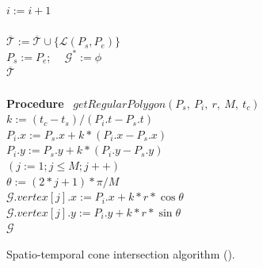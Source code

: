 \begin{figure}[tb!]
\begin{center}
{\begin{minipage}{3.36in}
{	\icc \> \hspace{6ex} $i := i+1$ \\
	\icc \>\hspace{3ex} \Else\\
	\icc \> \hspace{6ex} $\overline{\mathcal{T}} := \overline{\mathcal{T}}\cup \{\mathcal{L}(P_s,P_e)\}$ \\
	\icc \> \hspace{6ex} $P_s := P_e$;  ~~$\mathcal{G}^* := \phi$ \\
	\icc \hspace{1ex}\Return $\overline{\mathcal{T}}$ \\
\\
	{\bf Procedure} ~$getRegularPolygon(P_s,~P_i,~r,~M,~t_c)$ \\
	\bcc \hspace{1ex} $k := (t_c-t_s)/(P_i.t - P_s.t)$ \\
	\icc \hspace{1ex} $P_i.x := P_s.x + k*(P_i.x-P_s.x)$ \\
	\icc \hspace{1ex} $P_i.y := P_s.y + k*(P_i.y-P_s.y)$ \\
	\icc \hspace{1ex} \For $(j := 1;j \le M;j++)$ \\
	\icc \> \hspace{3ex} $\theta :=  (2 * j + 1)*\pi /M $ \\
	\icc \> \hspace{3ex} $\mathcal{G}.vertex[j].x := P_i.x + k*r*\cos\theta$\\
	\icc \> \hspace{3ex} $\mathcal{G}.vertex[j].y := P_i.y + k*r*\sin\theta$\\
	\icc \hspace{1ex} \Return $\mathcal{G}$
}
\vspace{-2ex}
\myhrule
\end{minipage}
}
\end{center}
\vspace{-2ex}
\caption{\small Spatio-temporal cone intersection algorithm (\cist).}
\label{alg:CI3d}
\vspace{-2ex}
\end{figure}



